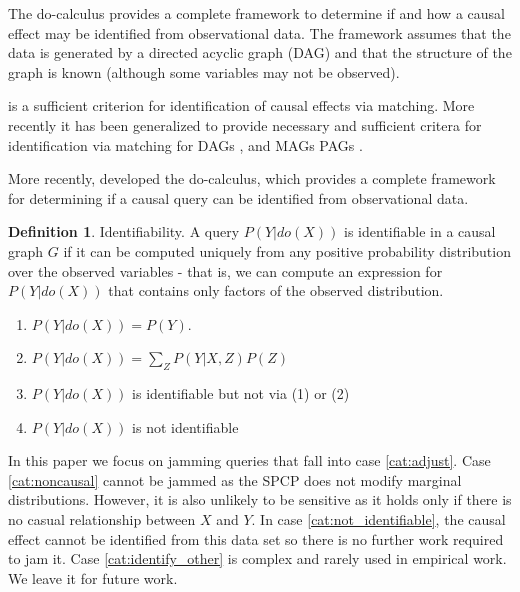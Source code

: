 \documentclass{article}
\theoremstyle{plain}
\theoremstyle{definition}
\newtheorem{definition}[theorem]{Definition}
\begin{document}
The do-calculus provides a complete framework to determine if and how a causal effect may be  identified from observational data. The framework assumes that the data is generated by a directed acyclic graph (DAG) and that the structure of the graph is known (although some variables may not be observed). 

is a sufficient criterion for identification of causal effects via matching. More recently it has been generalized to provide necessary and sufficient critera for identification via matching for DAGs \cite{}, and MAGs PAGs \cite{}. 

More recently, \cite{Pearl2000} developed the do-calculus, which provides a complete framework for determining if a causal query can be identified from observational data. 




\begin{definition}
Identifiability. 
A query $P(Y|do(X))$ is identifiable in a causal graph $G$ if it can be computed uniquely from any positive probability distribution over the observed variables - that is, we can compute an expression for $P(Y|do(X))$ that contains only factors of the observed distribution. 
\end{definition}
\begin{enumerate}
\item $P(Y|do(X)) = P(Y)$. 
\label{cat:noncausal}
\item $P(Y|do(X)) = \sum_Z P(Y|X,Z)P(Z)$
\label{cat:adjust}
\item $P(Y|do(X))$ is identifiable but not via (1) or (2)
\label{cat:identify_other}
\item $P(Y|do(X))$ is not identifiable
\label{cat:not_identifiable}
\end{enumerate}


In this paper we focus on jamming queries that fall into case \ref{cat:adjust}. Case \ref{cat:noncausal} cannot be jammed as the SPCP does not modify marginal distributions. However, it is also unlikely to be sensitive as it holds only if there is no casual relationship between $X$ and $Y$. In case \ref{cat:not_identifiable}, the causal effect cannot be identified from this data set so there is no further work required to jam it. Case \ref{cat:identify_other} is complex and rarely used in empirical work. We leave it for future work.
\end{document}

